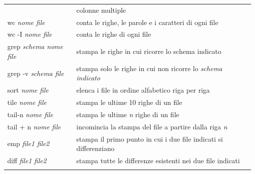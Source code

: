 \begin{tabular}{|ll|}
	&colonne multiple\\
	wc \textit{nome file} & conta le righe, le parole e i caratteri di ogni file\\
	wc -I \textit{nome file} & conta le righe di ogni file \\
	grep \textit{schema nome file} & stampa le righe in cui ricorre lo schema indicato\\
	grep -v \textit{schema file} & stampa solo le righe in cui non ricorre lo \textit{schema
	indicato}\\
	sort \textit{nome file} &elenca i file in ordine alfabetico riga per riga\\
	tile \textit{nome file} & stampa le ultime 10 righe di un file\\
	tail-n \textit{nome file} & stampa le ultime \textit{n} righe di un file\\
	tail + n \textit{nome file} &incomincia la stampa del file a partire dalla riga \textit{n}\\
	emp \textit{file1 file2} & stampa il primo punto in cui i due file indicati si differenziano\\
	diff  \textit{file1 file2} &stampa tutte le differenze esistenti nei due file indicati\\ & \\
\hline
\end{tabular}

